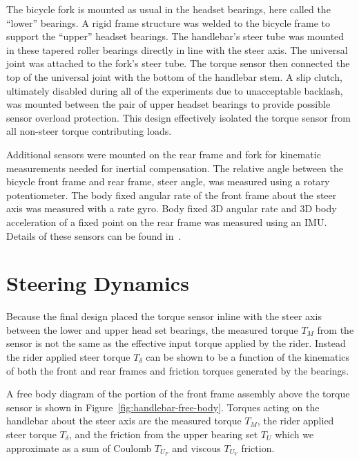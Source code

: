 \documentclass[10pt]{article}
\begin{document}
The bicycle fork is mounted as usual in the headset bearings, here called the
``lower''  bearings. A rigid frame structure was welded to the bicycle frame to
support the ``upper'' headset bearings. The handlebar's steer tube was mounted
in these tapered roller bearings directly in line with the steer axis. The
universal joint was attached to the fork's steer tube. The torque sensor then
connected the top of the universal joint with the bottom of the handlebar stem.
A slip clutch, ultimately disabled during all of the experiments due to
unacceptable backlash, was mounted between the pair of upper headset bearings
to provide possible sensor overload protection. This design effectively
isolated the torque sensor from all non-steer torque contributing loads.

Additional sensors were mounted on the rear frame and fork for kinematic
measurements needed for inertial compensation. The relative angle between the
bicycle front frame and rear frame, steer angle, was measured using a rotary
potentiometer. The body fixed angular rate of the front frame about the steer
axis was measured with a rate gyro. Body fixed 3D angular rate and 3D body
acceleration of a fixed point  on the rear frame was measured using an IMU.
Details of these sensors can be found in~\cite{Moore2012}.


\section*{Steering Dynamics}
\label{sec:steer-dynamics}


Because the final design placed the torque sensor inline with the steer axis
between the lower and upper head set bearings, the measured torque $T_M$ from
the sensor is not the same as the effective input torque applied by the rider.
Instead the rider applied steer torque $T_\delta$ can be shown to be a function
of the kinematics of both the front and rear frames and friction torques
generated by the bearings.

A free body diagram of the portion of the front frame assembly above the torque
sensor is shown in Figure~\ref{fig:handlebar-free-body}. Torques acting on the
handlebar about the steer axis are the measured torque $T_M$, the rider applied
steer torque $T_\delta$, and the friction from the upper bearing set $T_U$
which we approximate as a sum of Coulomb $T_{U_F}$ and viscous  $T_{U_V}$
friction.
\end{document}
